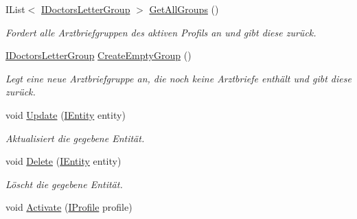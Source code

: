 \begin{CompactItemize}
IList$<$ \hyperlink{interfacemy_m_d_1_1_model_interface_1_1_data_model_interface_1_1_i_doctors_letter_group}{IDoctors\-Letter\-Group} $>$ \hyperlink{interfacemy_m_d_1_1_model_interface_1_1_model_facade_interface_1_1_i_model_facade_5975f81012b1229ab03cbfa932f3a8ae}{Get\-All\-Groups} ()
\begin{CompactList}\small\item\em Fordert alle Arztbriefgruppen des aktiven Profils an und gibt diese zur\"{u}ck. \item\end{CompactList}\item 
\hyperlink{interfacemy_m_d_1_1_model_interface_1_1_data_model_interface_1_1_i_doctors_letter_group}{IDoctors\-Letter\-Group} \hyperlink{interfacemy_m_d_1_1_model_interface_1_1_model_facade_interface_1_1_i_model_facade_7ce2fe6e33d0a78829c47a6b2f35e0fe}{Create\-Empty\-Group} ()
\begin{CompactList}\small\item\em Legt eine neue Arztbriefgruppe an, die noch keine Arztbriefe enth\"{a}lt und gibt diese zur\"{u}ck. \item\end{CompactList}\item 
void \hyperlink{interfacemy_m_d_1_1_model_interface_1_1_model_facade_interface_1_1_i_model_facade_bf510dc6cf79d153f564eca0f10971d2}{Update} (\hyperlink{interfacemy_m_d_1_1_model_interface_1_1_data_model_interface_1_1_i_entity}{IEntity} entity)
\begin{CompactList}\small\item\em Aktualisiert die gegebene Entit\"{a}t. \item\end{CompactList}\item 
void \hyperlink{interfacemy_m_d_1_1_model_interface_1_1_model_facade_interface_1_1_i_model_facade_1ec3022b27f9091440cb495f510d25b0}{Delete} (\hyperlink{interfacemy_m_d_1_1_model_interface_1_1_data_model_interface_1_1_i_entity}{IEntity} entity)
\begin{CompactList}\small\item\em L\"{o}scht die gegebene Entit\"{a}t. \item\end{CompactList}\item 
void \hyperlink{interfacemy_m_d_1_1_model_interface_1_1_model_facade_interface_1_1_i_model_facade_6ffa7bbff9bc4db881433251a158fbd0}{Activate} (\hyperlink{interfacemy_m_d_1_1_model_interface_1_1_data_model_interface_1_1_i_profile}{IProfile} profile)

\end{CompactItemize}
